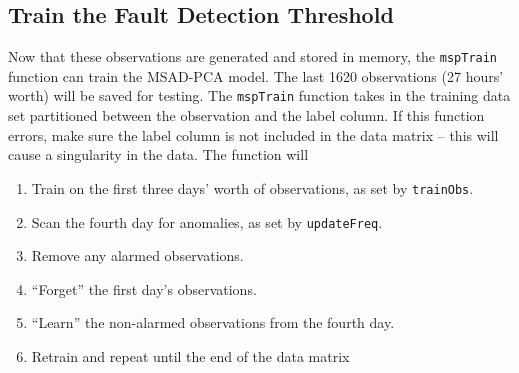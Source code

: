 \documentclass{report}\usepackage[]{graphicx}\usepackage[]{color}
\begin{document}
\subsection{Train the Fault Detection Threshold}
Now that these observations are generated and stored in memory, the \texttt{mspTrain} function can train the MSAD-PCA model. The last 1620 observations (27 hours' worth) will be saved for testing. The \texttt{mspTrain} function takes in the training data set partitioned between the observation and the label column. If this function errors, make sure the label column is not included in the data matrix -- this will cause a singularity in the data. The function will
\begin{enumerate}
\item Train on the first three days' worth of observations, as set by \texttt{trainObs}.
%
\item Scan the fourth day for anomalies, as set by \texttt{updateFreq}.
%
\item Remove any alarmed observations.
%
\item ``Forget'' the first day's observations.
%
\item ``Learn'' the non-alarmed observations from the fourth day.
%
\item Retrain and repeat until the end of the data matrix
\end{enumerate}
\end{document}
